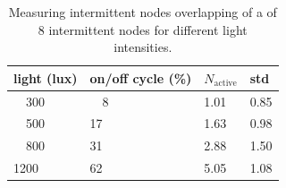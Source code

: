 \begin{table}
		\centering
		\caption{Measuring intermittent nodes overlapping of a \cis of 8 intermittent nodes for different light intensities.}
		\begin{tabular}{llll}
				\hline
				\textbf{light (lux)} &\textbf{on/off cycle (\%)}  & \textbf{$N_\text{active}$} & \textbf{std}   \\
				\hline
				\ \ 300	                 & \ \ 8  & 1.01 & 0.85   \\
				\ \ 500                  & 17 & 1.63 & 0.98   \\
				\ \ 800                  & 31 & 2.88 & 1.50   \\
				1200                 & 62 & 5.05 & 1.08   \\
				\hline
		\end{tabular}
		\label{tab:clusters}
\end{table}






































